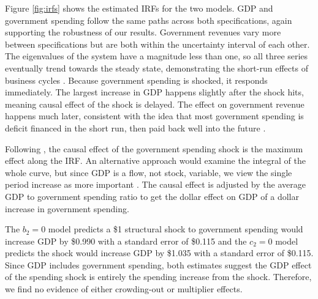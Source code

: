 Figure \ref{fig:irfs} shows the estimated IRFs for the two models. GDP and government spending follow the same paths across both specifications, again supporting the robustness of our results. Government revenues vary more between specifications but are both within the uncertainty interval of each other. The eigenvalues of the system have a magnitude less than one, so all three series eventually trend towards the steady state, demonstrating the short-run effects of business cycles \parencite{mitchell2024business}. Because government spending is shocked, it responds immediately. The largest increase in GDP happens slightly after the shock hits, meaning causal effect of the shock is delayed. The effect on government revenue happens much later, consistent with the idea that most government spending is deficit financed in the short run, then paid back well into the future \parencite{haley1941federal}.

Following \textcite{blanchard2002empirical}, the causal effect of the government spending shock is the maximum effect along the IRF. An alternative approach would examine the integral of the whole curve, but since GDP is a flow, not stock, variable, we view the single period increase as more important \parencite{deleidi2023government}. The causal effect is adjusted by the average GDP to government spending ratio to get the dollar effect on GDP of a dollar increase in government spending.

The $b_2 = 0$ model predicts a \$1 structural shock to government spending would increase GDP by \$0.990 with a standard error of \$0.115 and the $c_2 = 0$ model predicts the shock would increase GDP by \$1.035 with a standard error of \$0.115. Since GDP includes government spending, both estimates suggest the GDP effect of the spending shock is entirely the spending increase from the shock. Therefore, we find no evidence of either crowding-out or multiplier effects.
